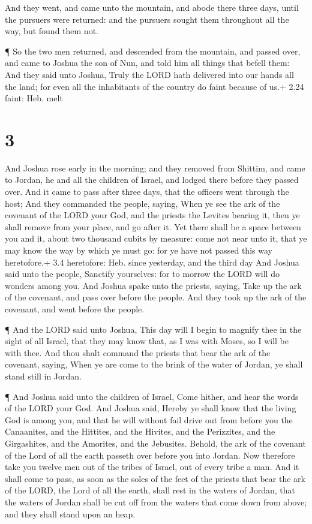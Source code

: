  And they went, and came unto the mountain, and abode there
three days, until the pursuers were returned: and the pursuers sought
them throughout all the way, but found them not.

 ¶ So the two men returned, and descended from the
mountain, and passed over, and came to Joshua the son of Nun, and told
him all things that befell them:  And they said unto
Joshua, Truly the LORD hath delivered into our hands all the land; for
even all the inhabitants of the country do faint because of us.+ 2.24
faint: Heb. melt

\hypertarget{section-2}{%
\section{3}\label{section-2}}

 And Joshua rose early in the morning; and they removed from
Shittim, and came to Jordan, he and all the children of Israel, and
lodged there before they passed over.  And it came to pass
after three days, that the officers went through the host; 
And they commanded the people, saying, When ye see the ark of the
covenant of the LORD your God, and the priests the Levites bearing it,
then ye shall remove from your place, and go after it.  Yet
there shall be a space between you and it, about two thousand cubits by
measure: come not near unto it, that ye may know the way by which ye
must go: for ye have not passed this way heretofore.+ 3.4 heretofore:
Heb. since yesterday, and the third day  And Joshua said
unto the people, Sanctify yourselves: for to morrow the LORD will do
wonders among you.  And Joshua spake unto the priests,
saying, Take up the ark of the covenant, and pass over before the
people. And they took up the ark of the covenant, and went before the
people.

 ¶ And the LORD said unto Joshua, This day will I begin to
magnify thee in the sight of all Israel, that they may know that, as I
was with Moses, so I will be with thee.  And thou shalt
command the priests that bear the ark of the covenant, saying, When ye
are come to the brink of the water of Jordan, ye shall stand still in
Jordan.

 ¶ And Joshua said unto the children of Israel, Come hither,
and hear the words of the LORD your God.  And Joshua said,
Hereby ye shall know that the living God is among you, and that he will
without fail drive out from before you the Canaanites, and the Hittites,
and the Hivites, and the Perizzites, and the Girgashites, and the
Amorites, and the Jebusites.  Behold, the ark of the
covenant of the Lord of all the earth passeth over before you into
Jordan.  Now therefore take you twelve men out of the
tribes of Israel, out of every tribe a man.  And it shall
come to pass, as soon as the soles of the feet of the priests that bear
the ark of the LORD, the Lord of all the earth, shall rest in the waters
of Jordan, that the waters of Jordan shall be cut off from the waters
that come down from above; and they shall stand upon an heap.

